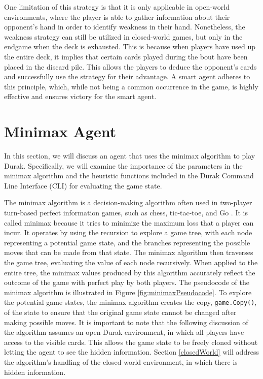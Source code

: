 One limitation of this strategy is that it is only applicable in open-world environments, where the player is able to gather information about their opponent's hand in order to identify weakness in their hand.  Nonetheless, the weakness strategy can still be utilized in closed-world games, but only in the endgame when the deck is exhausted. This is because when players have used up the entire deck, it implies that certain cards played during the bout have been placed in the discard pile. This allows the players to deduce the opponent's cards and successfully use the strategy for their advantage. A smart agent adheres to this principle, which, while not being a common occurrence in the game, is highly effective and ensures victory for the smart agent.

\section{Minimax Agent}
\label{minimax}

In this section, we will discuss an agent that uses the minimax algorithm to play Durak. Specifically, we will examine the importance of the parameters in the minimax algorithm and the heuristic functions included in the Durak Command Line Interface (CLI) for evaluating the game state.

The minimax algorithm is a decision-making algorithm often used in two-player turn-based perfect information games, such as chess, tic-tac-toe, and Go \citep{AI4Ed}. It is called minimax because it tries to minimize the maximum loss that a player can incur. It operates by using the recursion to explore a game tree, with each node representing a potential game state, and the branches representing the possible moves that can be made from that state. The minimax algorithm then traverses the game tree, evaluating the value of each node recursively. When applied to the entire tree, the minimax values produced by this algorithm accurately reflect the outcome of the game with perfect play by both players. The pseudocode of the minimax algorithm is illustrated in Figure \ref{fig:minimaxPseudocode}. To explore the potential game states, the minimax algorithm creates the copy, \texttt{game.Copy()}, of the state to ensure that the original game state cannot be changed after making possible moves. It is important to note that the following discussion of the algorithm assumes an open Durak environment, in which all players have access to the visible cards. This allows the game state to be freely cloned without letting the agent to see the hidden information. Section \ref{closedWorld} will address the algorithm's handling of the closed world environment, in which there is hidden information.


